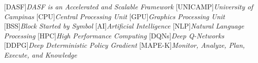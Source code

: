 [DASF]{\emph{DASF is an Accelerated and Scalable Framework}}
[UNICAMP]{\emph{University of Campinas}}
[CPU]{\emph{Central Processing Unit}}
[GPU]{\emph{Graphics Processing Unit}}
[BSS]{\emph{Block Started by Symbol}}
[AI]{\emph{Artificial Intelligence}}
[NLP]{\emph{Natural Language Processing}}
[HPC]{\emph{High Performance Computing}}
[DQNs]{\emph{Deep Q-Networks}}
[DDPG]{\emph{Deep Deterministic Policy Gradient}}
[MAPE-K]{\emph{Monitor, Analyze, Plan, Execute, and Knowledge}}
